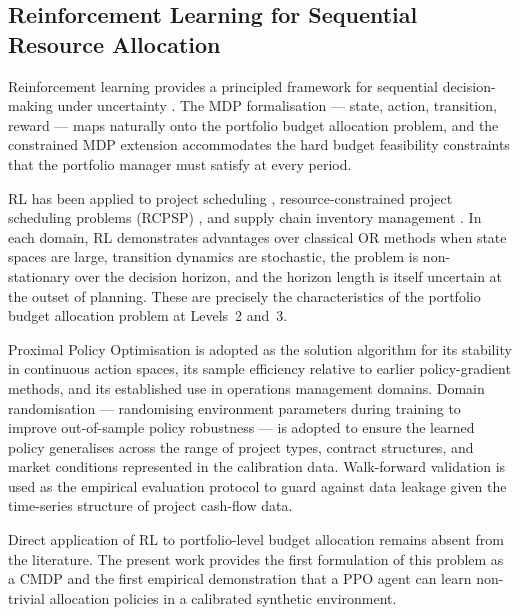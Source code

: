 \subsection{Reinforcement Learning for Sequential Resource Allocation}
\label{subsec:lr_rl}

Reinforcement learning provides a principled framework for sequential
decision-making under uncertainty \citep{Sutton2018}. The MDP
formalisation --- state, action, transition, reward --- maps naturally onto the
portfolio budget allocation problem, and the constrained MDP extension
\citep{altman1999constrained} accommodates the hard budget feasibility constraints that
the portfolio manager must satisfy at every period.

RL has been applied to project scheduling \citep{Peng2021, Liu2023},
resource-constrained project scheduling problems (RCPSP) \citep{Tassel2023},
and supply chain inventory management \citep{Giannoccaro2002}. In each domain,
 RL demonstrates advantages over classical OR methods when
state spaces are large, transition dynamics are stochastic, the problem is
non-stationary over the decision horizon, and the horizon length is itself
uncertain at the outset of planning. These are precisely the characteristics of the
portfolio budget allocation problem at Levels~2 and~3.

Proximal Policy Optimisation \citep{Schulman2017} is adopted as the solution
algorithm for its stability in continuous action spaces, its sample efficiency
relative to earlier policy-gradient methods, and its established use in
operations management domains. Domain randomisation \citep{Tobin2017} ---
randomising environment parameters during training to improve out-of-sample
policy robustness --- is adopted to ensure the learned policy generalises across
the range of project types, contract structures, and market conditions
represented in the calibration data. Walk-forward validation
\citep{Cerqueira2020} is used as the empirical evaluation protocol to guard
against data leakage given the time-series structure of project cash-flow data.

Direct application of RL to portfolio-level budget allocation remains absent
from the literature. The present work provides the first formulation of this
problem as a CMDP and the first empirical demonstration that a PPO agent can
learn non-trivial allocation policies in a calibrated synthetic environment.

